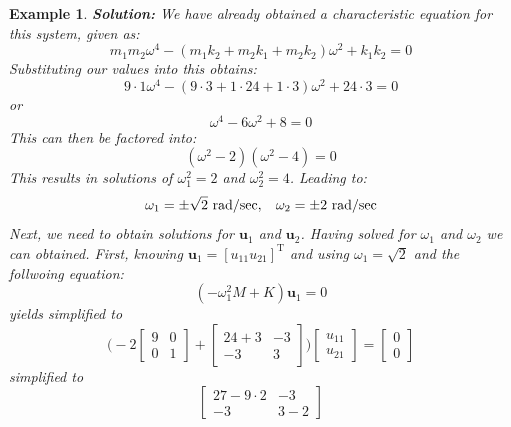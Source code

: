 \documentclass[12pt,letter]{article}
\newtheorem{ex}{Example}
\numberwithin{ex}{section} %
\newenvironment{example}{\begin{mdframed}[middlelinewidth=0.5mm]\begin{ex}\normalfont}{\end{ex}\end{mdframed}}
\numberwithin{re}{section} %
\begin{document}
\begin{example}
\textbf{Solution:} We have already obtained a characteristic equation for this system, given as:
\begin{equation}
m_1 m_2 \omega^4 - (m_1 k_2 + m_2 k_1 + m_2 k_2)\omega^2 + k_1 k_2 = 0
\end{equation}
Substituting our values into this obtains:
\begin{equation}
9 \cdot 1 \omega^4 - (9 \cdot 3 + 1 \cdot 24 + 1 \cdot 3)\omega^2 + 24 \cdot 3 = 0
\end{equation}
or
\begin{equation}
\omega^4 - 6\omega^2 + 8 =0
\end{equation}
This can then be factored into:
\begin{equation}
(\omega^2-2)(\omega^2-4)=0
\end{equation}
This results in solutions of $\omega^2_1 = 2$ and $\omega^2_2 = 4$. Leading to:
\begin{equation}
\omega_1 = \pm \sqrt{2} \text{ rad/sec}, \hspace{2ex} \omega_2 = \pm 2 \text{ rad/sec}
\end{equation}
Next, we need to obtain solutions for $\mathbf{u}_1$ and $\mathbf{u}_2$. Having solved for $\omega_1$ and $\omega_2$ we can obtained. First, knowing $\mathbf{u}_1 = [u_{11} u_{21}]^\text{T}$ and using $\omega_1 = \sqrt{2}$ and the follwoing equation:
\begin{equation}
	(-\omega_1^2 M  + K)\mathbf{u}_1 =0
\end{equation}
yields
simplified to
\begin{equation}
	 \bigg(-2\begin{bmatrix} 9 & 0 \\   0  & 1 \end{bmatrix} + \begin{bmatrix} 24+3 & -3 \\    -3  & 3 \end{bmatrix}\bigg)\begin{bmatrix} u_{11}\\ u_{21}\end{bmatrix} = \begin{bmatrix} 0\\ 0\end{bmatrix}
\end{equation}
simplified to
\begin{equation}
	 \begin{bmatrix} 27-9\cdot 2 & -3 \\    -3  & 3-2 \end{bmatrix} 

\end{equation}
\end{example}
\end{document}
